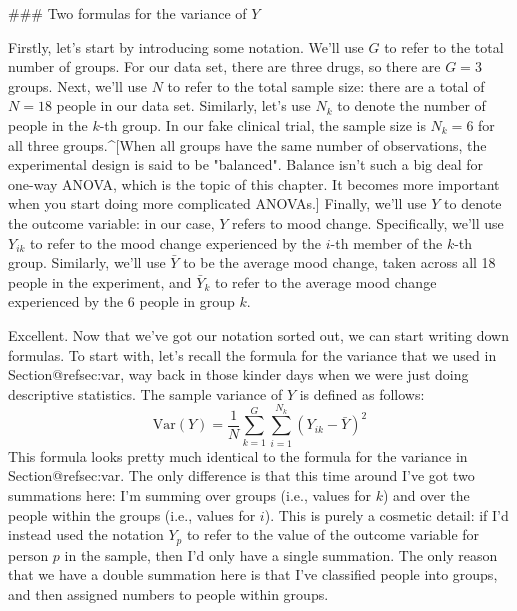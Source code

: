 ### Two formulas for the variance of $Y$

Firstly, let's start by introducing some notation. We'll use $G$ to refer to the total number of groups. For our data set, there are three drugs, so there are $G=3$ groups. Next, we'll use $N$ to refer to the total sample size: there are a total of $N=18$ people in our data set. Similarly, let's use $N_k$ to denote the number of people in the $k$-th group. In our fake clinical trial, the sample size is $N_k = 6$ for all three groups.^[When all groups have the same number of observations, the experimental design is said to be "balanced". Balance isn't such a big deal for one-way ANOVA, which is the topic of this chapter. It becomes more important when you start doing more complicated ANOVAs.] Finally, we'll use $Y$ to denote the outcome variable: in our case, $Y$ refers to mood change. Specifically, we'll use $Y_{ik}$ to refer to the mood change experienced by the $i$-th member of the $k$-th group. Similarly, we'll use $\bar{Y}$ to be the average mood change, taken across all 18 people in the experiment, and $\bar{Y}_k$ to refer to the average mood change experienced by the 6 people in group $k$.  

Excellent. Now that we've got our notation sorted out, we can start writing down formulas. To start with, let's recall the formula for the variance that we used in Section@refsec:var, way back in those kinder days when we were just doing descriptive statistics. The sample variance of $Y$ is defined as follows:
$$
\mbox{Var}(Y) = \frac{1}{N} \sum_{k=1}^G \sum_{i=1}^{N_k} \left(Y_{ik} - \bar{Y} \right)^2
$$
This formula looks pretty much identical to the formula for the variance in Section@refsec:var. The only difference is that this time around I've got two summations here: I'm summing over groups (i.e., values for $k$) and over the people within the groups (i.e., values for $i$). This is purely a cosmetic detail: if I'd instead used the notation $Y_p$ to refer to the value of the outcome variable for person $p$ in the sample, then I'd only have a single summation. The only reason that we have a double summation here is that I've classified people into groups, and then assigned numbers to people within groups. 


